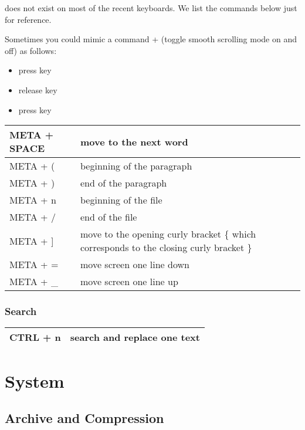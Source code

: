 \documentclass[letterpaper,10pt,english]{sphinxmanual}
\begin{document}
 does not exist on most of the recent keyboards. We list the commands below just for reference.

Sometimes you could mimic a command  +  (toggle smooth scrolling mode on and off) as follows:
\begin{itemize}
\item {} 
press  key

\item {} 
release  key

\item {} 
press  key

\end{itemize}

\begin{tabulary}{\linewidth}{|L|L|}
\hline

META + SPACE
 & 
move to the next word
\\
\hline
META + (
 & 
beginning of the paragraph
\\
\hline
META + )
 & 
end of the paragraph
\\
\hline
META + n
 & 
beginning of the file
\\
\hline
META + /
 & 
end of the file
\\
\hline
META + {]}
 & 
move to the opening curly bracket \{ which corresponds to the closing curly bracket \}
\\
\hline
META + =
 & 
move screen one line down
\\
\hline
META + \_
 & 
move screen one line up
\\
\hline\end{tabulary}



\subsection{Search}
\label{editor/nano:search}
\begin{tabulary}{\linewidth}{|L|L|}
\hline

CTRL + n
 & 
search and replace one text
\\
\hline\end{tabulary}



\chapter{System}
\label{index:system}

\section{Archive and Compression}
\label{system/linux/archive:archive-and-compression}\label{system/linux/archive::doc}
\end{document}
